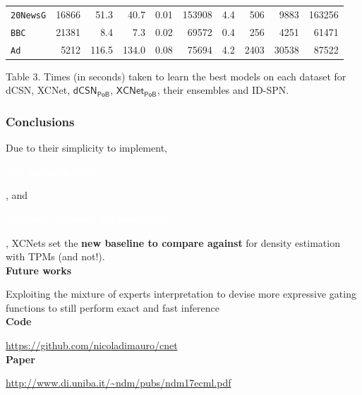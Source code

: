 \documentclass[xcolor={usenames,dvipsnames,svgnames}, compress]{beamer}
\newcommand{\highlighttext}[2][yellow]{{\colorbox{#1}{\strut\textcolor{white}{#2}}}}
\begin{document}
\begin{frame}[t]
\begin{table}[t]
\begin{tabular}{l rrr r r r r r r}
    \texttt{20NewsG}&16866&51.3&40.7&	0.01&153908&4.4& 506& 9883&163256\\ 
    \texttt{BBC}&21381&8.4&7.3&	0.02&69572&0.4& 256& 4251 &61471\\ 
    \texttt{Ad}&5212&116.5&134.0&	0.08&75694&4.2&2403 & 30538 &87522\\ 
    \bottomrule
  \end{tabular}
  \label{tab:exptimes}
\end{table}\vspace{-10pt}
\hspace{30pt}\begin{minipage}{0.8\linewidth}
 \tiny Table 3. Times (in seconds) taken to learn the best models on each dataset
for \textsf{dCSN}, \textsf{XCNet}, $\mathsf{dCSN_{PoB}}$, $\mathsf{XCNet_{PoB}}$, their ensembles
and \textsf{ID-SPN}.
\end{minipage}
\end{frame}

\begin{frame}[t]
  \frametitle{Conclusions}
  \small
  

  Due to their simplicity to implement, \highlighttext[gold4]{\textbf{\emph{fast learning times}}}, and \highlighttext[lacamlilac]{\emph{\textbf{accurate
inference performances}}}, XCNets set the \textbf{new baseline to compare against} for density
estimation with TPMs (and not!).\\[20pt]

\textbf{\normalsize Future works}\par 
Exploiting the mixture of
experts interpretation to devise more expressive gating functions
to still perform exact and fast inference\\[20pt]

\textbf{\normalsize Code}\par 
\url{https://github.com/nicoladimauro/cnet}\\[10pt]

\textbf{\normalsize Paper}\par 
\url{http://www.di.uniba.it/~ndm/pubs/ndm17ecml.pdf}

\end{frame}
\end{document}
